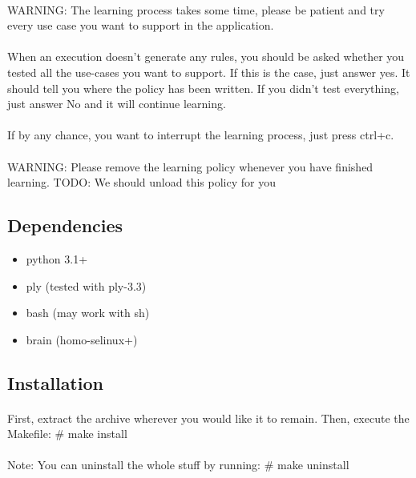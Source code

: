 \paragraph*{}
WARNING: The learning process takes some time, please be patient and try every use case you want to support in the application.

\paragraph*{}
When an execution doesn't generate any rules, you should be asked whether you tested all the use-cases you want to support.
If this is the case, just answer yes. It should tell you where the policy has been written.
If you didn't test everything, just answer No and it will continue learning.

\paragraph*{}
If by any chance, you want to interrupt the learning process, just press ctrl+c.

\paragraph*{}
WARNING: Please remove the learning policy whenever you have finished learning.
TODO: We should unload this policy for you

\subsection*{Dependencies}
\begin{itemize}
	\item python 3.1+
	\item ply (tested with ply-3.3)
	\item bash (may work with sh)
	\item brain (homo-selinux+)
\end{itemize}
\subsection*{Installation}
\paragraph*{}
First, extract the archive wherever you would like it to remain.
Then, execute the Makefile: \# make install

\paragraph*{}
Note: You can uninstall the whole stuff by running: \# make uninstall

